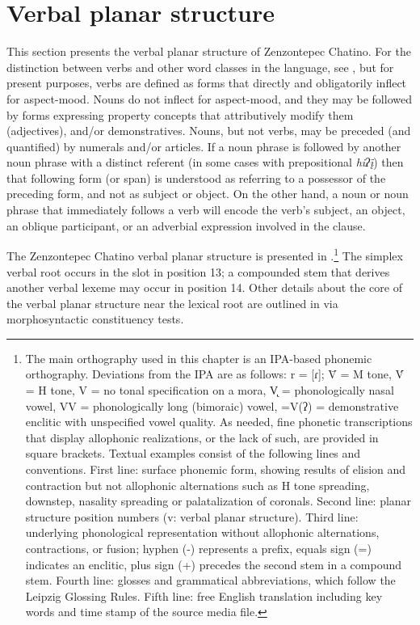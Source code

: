 \documentclass[output=paper]{langscibook}
\begin{document}
\largerpage[2]
\section{Verbal planar structure}
\label{bkm:Ref90318196}
This section presents the verbal planar structure of Zenzontepec Chatino. For the distinction between verbs and other word classes in the language, see \citet{Campbell2014}, but for present purposes, verbs are defined as forms that directly and obligatorily inflect for aspect-mood. Nouns do not inflect for aspect-mood, and they may be followed by forms expressing property concepts that attributively modify them (adjectives), and/or demonstratives. Nouns, but not verbs, may be preceded (and quantified) by numerals and/or articles. If a noun phrase is followed by another noun phrase with a distinct referent (in some cases with prepositional \textit{hiʔį̄}) then that following form (or span) is understood as referring to a possessor of the preceding form, and not as subject or object. On the other hand, a noun or noun phrase that immediately follows a verb will encode the verb's subject, an object, an oblique participant, or an adverbial expression involved in the clause.

The Zenzontepec Chatino verbal planar structure is presented in .\footnote{The main orthography used in this chapter is an IPA-based phonemic orthography.
Deviations from the IPA are as follows: r = [ɾ]; V̄ = M tone, V́ = H tone, V = no tonal specification on a mora, V̨ = phonologically nasal vowel, VV = phonologically long (bimoraic) vowel, =V(ʔ) = demonstrative enclitic with unspecified vowel quality. As needed, fine phonetic transcriptions that display allophonic realizations, or the lack of such, are provided in square brackets. Textual examples consist of the following lines and conventions. First line: surface phonemic form, showing results of elision and contraction but not allophonic alternations such as H tone spreading, downstep, nasality spreading or palatalization of coronals. Second line: planar structure position numbers (v: verbal planar structure). Third line: underlying phonological representation without allophonic alternations, contractions, or fusion; hyphen (-) represents a prefix, equals sign (=) indicates an enclitic, plus sign (+) precedes the second stem in a compound stem. Fourth line: glosses and grammatical abbreviations, which follow the Leipzig Glossing Rules. Fifth line: free English translation including key words and time stamp of the source media file.} 
The simplex verbal root occurs in the slot in position 13; a compounded stem that derives another verbal lexeme may occur in position 14. Other details about the core of the verbal planar structure near the lexical root are outlined in  via morphosyntactic constituency tests.
\end{document}
